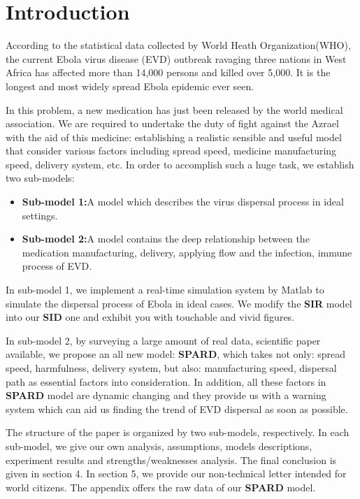 \section{Introduction}
According to the statistical data collected by World Heath Organization(WHO)\cite{ebolafactsheet}, the current Ebola virus disease (EVD) outbreak ravaging three nations in West Africa has affected more than 14,000 persons and killed over 5,000. It is the longest and most widely spread Ebola epidemic ever seen.

In this problem, a new medication has just been released by the world medical association. We are required to undertake the duty of fight against the Azrael with the aid of this medicine: establishing a realistic sensible and useful model that consider various factors including spread speed, medicine manufacturing speed, delivery system, etc. In order to accomplish such a huge task, we establish two sub-models:

\begin{itemize}
\item \textbf{Sub-model 1:}A model which describes the virus dispersal process in ideal settings.
\item \textbf{Sub-model 2:}A model contains the deep relationship between the medication manufacturing, delivery, applying flow and the infection, immune process of EVD. 
\end{itemize} 

In sub-model 1, we implement a real-time simulation system by Matlab to simulate the dispersal process of Ebola in ideal cases. We modify the\textbf{ SIR} model into our \textbf{SID} one and exhibit you with touchable and vivid figures.

In sub-model 2, by surveying a large amount of real data, scientific paper available, we propose an all new model: \textbf{SPARD}, which takes not only: spread speed, harmfulness, delivery system, but also: manufacturing speed, dispersal path as essential factors into consideration. In addition, all these factors in \textbf{SPARD} model are dynamic changing and they provide us with a warning system which can aid us finding the trend of EVD dispersal as soon as possible.

The structure of the paper is organized by two sub-models, respectively. In each sub-model, we give our own analysis, assumptions, models descriptions, experiment results and strengths/weaknesses analysis. The final conclusion is given in section 4. In section 5, we provide our non-technical letter intended for world citizens. The appendix offers the raw data of our \textbf{SPARD} model.

